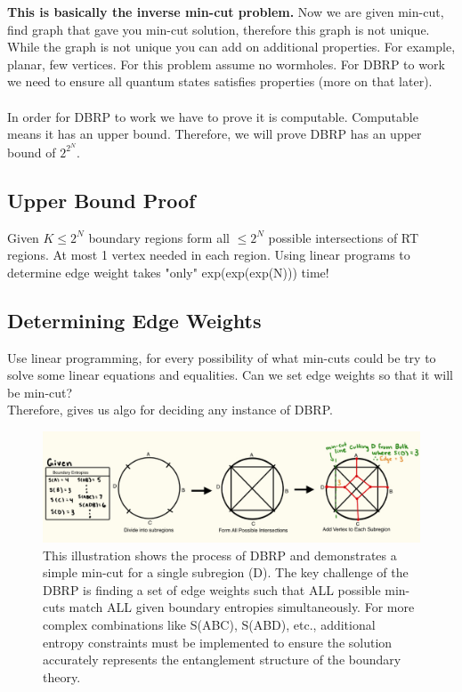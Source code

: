 \documentclass[12pt]{article}
\begin{document}
\textbf{This is basically the inverse min-cut problem.} Now we are given min-cut, find graph that gave you min-cut solution, therefore this graph is not unique. While the graph is not unique you can add on additional properties. For example, planar, few vertices. For this problem assume no wormholes. For DBRP to work we need to ensure all quantum states satisfies properties (more on that later). \\
\\
\indent In order for DBRP to work we have to prove it is computable. Computable means it has an upper bound.
Therefore, we will prove DBRP has an upper bound of $2^{2^N}$.

\subsection{Upper Bound Proof}
Given $K\leq2^N$ boundary regions form all $\leq2^N$ possible intersections of RT regions. At most 1 vertex needed in each region. Using linear programs to determine edge weight takes "only" exp(exp(exp(N))) time!

\subsection{Determining Edge Weights}
Use linear programming, for every possibility of what min-cuts could be try to solve some linear equations and equalities. Can we set edge weights so that it will be min-cut?
\\Therefore, gives us algo for deciding any instance of DBRP.

\begin{figure}[htbp]  %
    \centering
    \includegraphics[width=\textwidth]{vertex_subregions.jpeg}  %
    \caption{This illustration shows the process of DBRP and demonstrates a simple min-cut for a single subregion (D). The key challenge of the DBRP is finding a set of edge weights such that ALL possible min-cuts match ALL given boundary entropies simultaneously. For more complex combinations like S(ABC), S(ABD), etc., additional entropy constraints must be implemented to ensure the solution accurately represents the entanglement structure of the boundary theory.}  %
    \label{fig:single subregion min-cut}  %
\end{figure}
\end{document}
